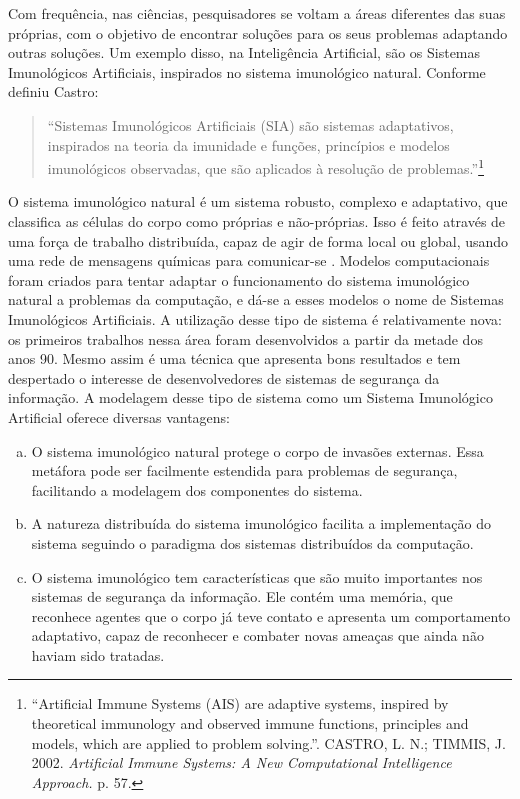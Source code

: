Com frequência, nas ciências, pesquisadores se voltam a áreas diferentes das suas próprias, com o objetivo de encontrar soluções para os seus problemas adaptando outras soluções. Um exemplo disso, na Inteligência Artificial, são os Sistemas Imunológicos Artificiais, inspirados no sistema imunológico natural. Conforme definiu Castro:

\begin{quote}
``Sistemas Imunológicos Artificiais (SIA) são sistemas adaptativos, inspirados na teoria da imunidade e funções, princípios e modelos imunológicos observadas, que são aplicados à resolução de problemas.''\footnote{``Artificial Immune Systems (AIS) are adaptive systems, inspired by theoretical immunology and observed immune functions, principles and models, which are applied to problem solving.''. CASTRO, L. N.; TIMMIS, J. 2002. \emph{Artificial Immune Systems: A New Computational Intelligence Approach.} p. 57.}
\end{quote}

O sistema imunológico natural é um sistema robusto, complexo e adaptativo, que classifica as células do corpo como próprias e não-próprias. Isso é feito através de uma força de trabalho distribuída, capaz de agir de forma local ou global, usando uma rede de mensagens químicas para comunicar-se \cite{Aickelin2005}. Modelos computacionais foram criados para tentar adaptar o funcionamento do sistema imunológico natural a problemas da computação, e dá-se a esses modelos o nome de Sistemas Imunológicos Artificiais. A utilização desse tipo de sistema é relativamente nova: os primeiros trabalhos nessa área foram desenvolvidos a partir da metade dos anos 90. Mesmo assim é uma técnica que apresenta bons resultados e tem despertado o interesse de desenvolvedores de sistemas de segurança da informação. A modelagem desse tipo de sistema como um Sistema Imunológico Artificial oferece diversas vantagens:

\begin{enumerate}[a)]
\item O sistema imunológico natural protege o corpo de invasões externas. Essa metáfora pode ser facilmente estendida para problemas de segurança, facilitando a modelagem dos componentes do sistema.
\item A natureza distribuída do sistema imunológico facilita a implementação do sistema seguindo o paradigma dos sistemas distribuídos da computação.
\item O sistema imunológico tem características que são muito importantes nos sistemas de segurança da informação. Ele contém uma memória, que reconhece agentes que o corpo já teve contato e apresenta um comportamento adaptativo, capaz de reconhecer e combater novas ameaças que ainda não haviam sido tratadas.
\end{enumerate}

